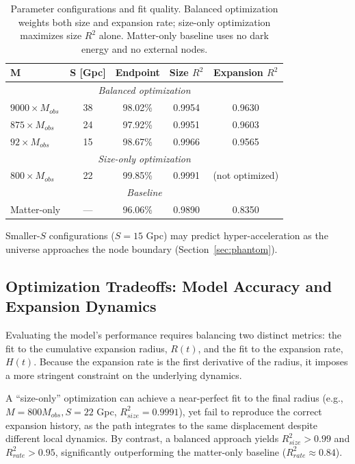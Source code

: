 \documentclass{article}
\begin{document}
\begin{table}[htbp]
\centering
\begin{tabular}{lcccc}
\toprule
\textbf{M} & \textbf{S [Gpc]} & \textbf{Endpoint} & \textbf{Size $R^2$} & \textbf{Expansion $R^2$} \\
\midrule
\multicolumn{5}{c}{\textit{Balanced optimization}} \\
$9000 \times M_{obs}$ & 38 & 98.02\% & 0.9954 & 0.9630 \\
$875 \times M_{obs}$ & 24 & 97.92\% & 0.9951 & 0.9603 \\
$92 \times M_{obs}$ & 15 & 98.67\% & 0.9966 & 0.9565 \\
\midrule
\multicolumn{5}{c}{\textit{Size-only optimization}} \\
$800 \times M_{obs}$ & 22 & 99.85\% & 0.9991 & (not optimized) \\
\midrule
\multicolumn{5}{c}{\textit{Baseline}} \\
Matter-only & --- & 96.06\% & 0.9890 & 0.8350 \\
\bottomrule
\end{tabular}
\caption{Parameter configurations and fit quality. Balanced optimization weights both size and expansion rate; size-only optimization maximizes size $R^2$ alone. Matter-only baseline uses no dark energy and no external nodes.}
\label{tab:results}
\end{table}

Smaller-$S$ configurations ($S = 15$ Gpc) may predict hyper-acceleration as the universe approaches the node boundary (Section~\ref{sec:phantom}).

\subsection{Optimization Tradeoffs: Model Accuracy and Expansion Dynamics}
\label{sec:tradeoffs}

Evaluating the model's performance requires balancing two distinct metrics: the fit to the cumulative expansion radius, $R(t)$, and the fit to the expansion rate, $H(t)$. Because the expansion rate is the first derivative of the radius, it imposes a more stringent constraint on the underlying dynamics. 

A ``size-only'' optimization can achieve a near-perfect fit to the final radius (e.g., $M=800 M_{obs}, S=22$ Gpc, $R^2_{size} = 0.9991$), yet fail to reproduce the correct expansion history, as the path integrates to the same displacement despite different local dynamics. By contrast, a balanced approach yields $R^2_{size} > 0.99$ and $R^2_{rate} > 0.95$, significantly outperforming the matter-only baseline ($R^2_{rate} \approx 0.84$). 
\end{document}
